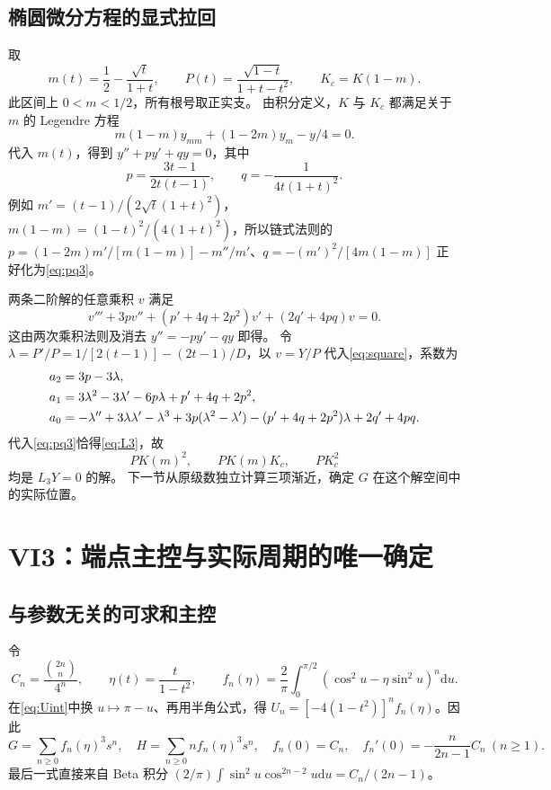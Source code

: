 \documentclass[11pt,a4paper]{article}
\numberwithin{equation}{section}
\theoremstyle{remark}\newtheorem{remark}[theorem]{说明}
\newcommand{\dd}{\mathrm d}
\begin{document}
\subsection{椭圆微分方程的显式拉回}
取
\begin{equation}\label{eq:mP}
 m(t)=\frac12-\frac{\sqrt t}{1+t},\qquad
 P(t)=\frac{\sqrt{1-t}}{1+t-t^2},\qquad K_c=K(1-m).
\end{equation}
此区间上 $0<m<1/2$，所有根号取正实支。
由积分定义，$K$ 与 $K_c$ 都满足关于 $m$ 的 Legendre 方程
\[
 m(1-m)y_{mm}+(1-2m)y_m-y/4=0.
\]
代入 $m(t)$，得到 $y''+py'+qy=0$，其中
\begin{equation}\label{eq:pq3}
 p=\frac{3t-1}{2t(t-1)},\qquad q=-\frac1{4t(1+t)^2}.
\end{equation}
例如 $m'=(t-1)/(2\sqrt t(1+t)^2)$，
$m(1-m)=(1-t)^2/(4(1+t)^2)$，所以链式法则的
$p=(1-2m)m'/[m(1-m)]-m''/m'$、$q=-(m')^2/[4m(1-m)]$
正好化为\eqref{eq:pq3}。

两条二阶解的任意乘积 $v$ 满足
\begin{equation}\label{eq:square}
 v'''+3pv''+(p'+4q+2p^2)v'+(2q'+4pq)v=0.
\end{equation}
这由两次乘积法则及消去 $y''=-py'-qy$ 即得。
令 $\lambda=P'/P=1/[2(t-1)]-(2t-1)/D$，以 $v=Y/P$ 代入\eqref{eq:square}，系数为
\begin{align}
 a_2&=3p-3\lambda,\notag\\
 a_1&=3\lambda^2-3\lambda'-6p\lambda+p'+4q+2p^2,\label{eq:gaugesquare}\\
 a_0&=-\lambda''+3\lambda\lambda'-\lambda^3+3p(\lambda^2-\lambda')
 -(p'+4q+2p^2)\lambda+2q'+4pq.\notag
\end{align}
代入\eqref{eq:pq3}恰得\eqref{eq:L3}，故
\begin{equation}\label{eq:basisraw}
 PK(m)^2,\qquad PK(m)K_c,\qquad PK_c^2
\end{equation}
均是 $L_3Y=0$ 的解。
下一节从原级数独立计算三项渐近，确定 $G$ 在这个解空间中的实际位置。

\section{VI3：端点主控与实际周期的唯一确定}
\subsection{与参数无关的可求和主控}
令
\[
 C_n=\frac{\binom{2n}n}{4^n},\qquad \eta(t)=\frac{t}{1-t^2},\qquad
 f_n(\eta)=\frac2\pi\int_0^{\pi/2}(\cos^2u-\eta\sin^2u)^n\dd u.
\]
在\eqref{eq:Uint}中换 $u\mapsto\pi-u$、再用半角公式，得
$U_n=[-4(1-t^2)]^nf_n(\eta)$。因此
\begin{equation}\label{eq:fseries}
 G=\sum_{n\ge0}f_n(\eta)^3s^n,\quad H=\sum_{n\ge0}nf_n(\eta)^3s^n,\quad
 f_n(0)=C_n,\quad f_n'(0)=-\frac{n}{2n-1}C_n\ (n\ge1).
\end{equation}
最后一式直接来自 Beta 积分
$(2/\pi)\int\sin^2u\cos^{2n-2}u\dd u=C_n/(2n-1)$。
\end{document}
